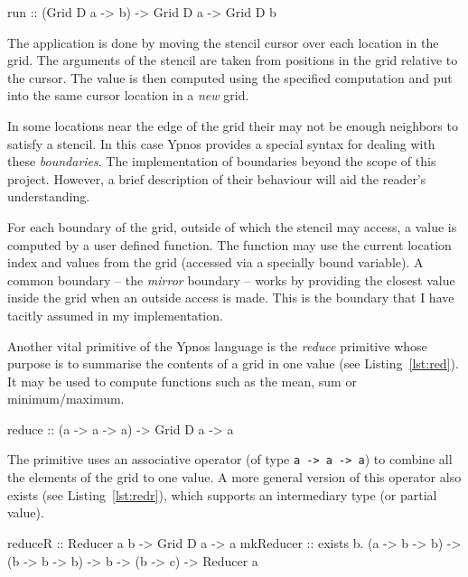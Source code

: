 \documentclass[12pt,a4paper,oneside]{scrbook}
\begin{document}
\begin{hflisting}[label={lst:run}, caption=The basic run primitive as defined in
  the original Ypnos paper\cite{ypnos-damp10}.]
run :: (Grid D a -> b) -> Grid D a -> Grid D b
\end{hflisting}

The application is done by moving the stencil cursor over each location
in the grid. The arguments of the stencil are taken from positions in
the grid relative to the cursor. The value is then computed using the
specified computation and put into the same cursor location in a
\emph{new} grid.

In some locations near the edge of the grid their may not be enough neighbors to
satisfy a stencil. In this case Ypnos provides a special syntax for dealing with
these \emph{boundaries}. The implementation of boundaries beyond the scope of
this project. However, a brief description of their behaviour will aid the
reader's understanding.

For each boundary of the grid, outside of which the stencil may access, a value
is computed by a user defined function. The function may use the current
location index and values from the grid (accessed via a specially bound
variable). A common boundary -- the \emph{mirror} boundary -- works by providing
the closest value inside the grid when an outside access is made. This is the
boundary that I have tacitly assumed in my implementation.

Another vital primitive of the Ypnos language is the \emph{reduce} primitive
whose purpose is to summarise the contents of a grid in one value (see
Listing~\ref{lst:red}). It may be used to compute functions such as the mean,
sum or minimum/maximum.

\begin{hflisting}[label={lst:red}, caption=The basic reduction primitive as
  defined in the original Ypnos paper.]
reduce :: (a -> a -> a) -> Grid D a -> a
\end{hflisting}

The primitive uses an associative operator (of type \texttt{a -\textgreater{} a
  -\textgreater{} a}) to combine all the elements of the grid to one value. A
more general version of this operator also exists (see Listing~\ref{lst:redr}),
which supports an intermediary type (or partial value).

\begin{hflisting}[label={lst:redr}, caption=The more general version of the
  reducer allowing for intermediary values.]
reduceR :: Reducer a b -> Grid D a -> a mkReducer :: exists b. (a -> b -> b)
-> (b -> b -> b) -> b -> (b -> c) -> Reducer a
\end{hflisting}
\end{document}
